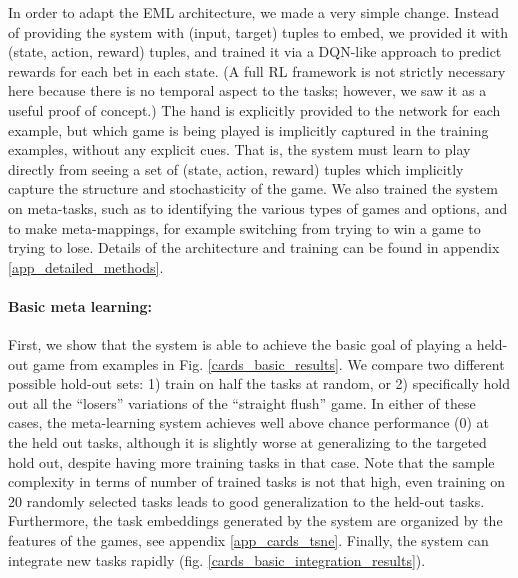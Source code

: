 \documentclass{article}
\begin{document}
In order to adapt the EML architecture, we made a very simple change. Instead of providing the system with (input, target) tuples to embed, we provided it with (state, action, reward) tuples, and trained it via a DQN-like approach \citep{Mnih2015} to predict rewards for each bet in each state. (A full RL framework is not strictly necessary here because there is no temporal aspect to the tasks; however, we saw it as a useful proof of concept.) The hand is explicitly provided to the network for each example, but which game is being played is implicitly captured in the training examples, without any explicit cues. That is, the system must learn to play directly from seeing a set of (state, action, reward) tuples which implicitly capture the structure and stochasticity of the game. We also trained the system on meta-tasks, such as to identifying the various types of games and options, and to make meta-mappings, for example switching from trying to win a game to trying to lose. Details of the architecture and training can be found in appendix \ref{app_detailed_methods}. \par
\vspace{-0.7em}
\paragraph{Basic meta learning:} First, we show that the system is able to achieve the basic goal of playing a held-out game from examples in Fig. \ref{cards_basic_results}. We compare two different possible hold-out sets: 1) train on half the tasks at random, or 2) specifically hold out all the ``losers'' variations of the ``straight flush'' game. In either of these cases, the meta-learning system achieves well above chance performance (0) at the held out tasks, although it is slightly worse at generalizing to the targeted hold out, despite having more training tasks in that case. Note that the sample complexity in terms of number of trained tasks is not that high, even training on 20 randomly selected tasks leads to good generalization to the held-out tasks. Furthermore, the task embeddings generated by the system are organized by the features of the games, see appendix \ref{app_cards_tsne}. Finally, the system can integrate new tasks rapidly (fig. \ref{cards_basic_integration_results}).\par
\vspace{-0.7em}
\end{document}
